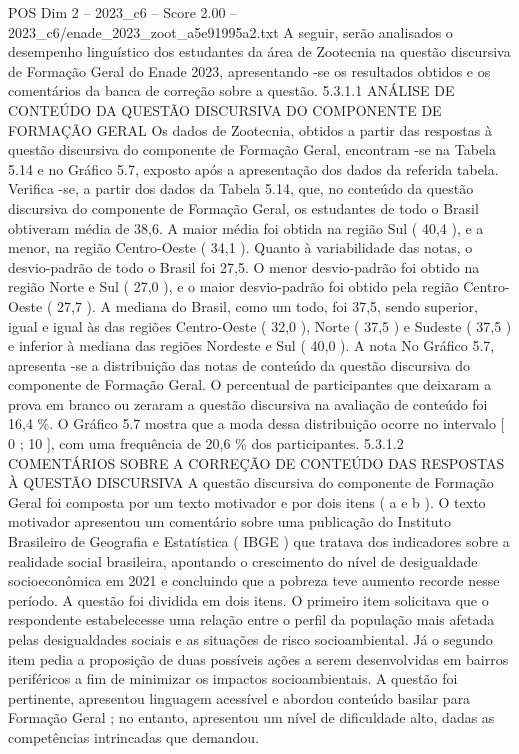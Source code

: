 \begin{textsample}{POS Dim 2 – 2023\_c6 – Score 2.00 – 2023\_c6/enade\_2023\_zoot\_a5e91995a2.txt}
A seguir, serão analisados o desempenho linguístico dos estudantes da área de Zootecnia na questão discursiva de Formação Geral do Enade 2023, apresentando -se os resultados obtidos e os comentários da banca de correção sobre a questão. 5.3.1.1 ANÁLISE DE CONTEÚDO DA QUESTÃO DISCURSIVA DO COMPONENTE DE FORMAÇÃO GERAL Os dados de Zootecnia, obtidos a partir das respostas à questão discursiva do componente de Formação Geral, encontram -se na Tabela 5.14 e no Gráfico 5.7, exposto após a apresentação dos dados da referida tabela.
Verifica -se, a partir dos dados da Tabela 5.14, que, no conteúdo da questão discursiva do componente de Formação Geral, os estudantes de todo o Brasil obtiveram média de 38,6.
A maior média foi obtida na região Sul ( 40,4 ), e a menor, na região Centro-Oeste ( 34,1 ).
Quanto à variabilidade das notas, o desvio-padrão de todo o Brasil foi 27,5.
O menor desvio-padrão foi obtido na região Norte e Sul ( 27,0 ), e o maior desvio-padrão foi obtido pela região Centro-Oeste ( 27,7 ).
A mediana do Brasil, como um todo, foi 37,5, sendo superior, igual e igual às das regiões Centro-Oeste ( 32,0 ), Norte ( 37,5 ) e Sudeste ( 37,5 ) e inferior à mediana das regiões Nordeste e Sul ( 40,0 ).
A nota No Gráfico 5.7, apresenta -se a distribuição das notas de conteúdo da questão discursiva do componente de Formação Geral.
O percentual de participantes que deixaram a prova em branco ou zeraram a questão discursiva na avaliação de conteúdo foi 16,4 \%.
O Gráfico 5.7 mostra que a moda dessa distribuição ocorre no intervalo [ 0 ; 10 ], com uma frequência de 20,6 \% dos participantes. 5.3.1.2 COMENTÁRIOS SOBRE A CORREÇÃO DE CONTEÚDO DAS RESPOSTAS À QUESTÃO DISCURSIVA A questão discursiva do componente de Formação Geral foi composta por um texto motivador e por dois itens ( a e b ).
O texto motivador apresentou um comentário sobre uma publicação do Instituto Brasileiro de Geografia e Estatística ( IBGE ) que tratava dos indicadores sobre a realidade social brasileira, apontando o crescimento do nível de desigualdade socioeconômica em 2021 e concluindo que a pobreza teve aumento recorde nesse período.
A questão foi dividida em dois itens.
O primeiro item solicitava que o respondente estabelecesse uma relação entre o perfil da população mais afetada pelas desigualdades sociais e as situações de risco socioambiental.
Já o segundo item pedia a proposição de duas possíveis ações a serem desenvolvidas em bairros periféricos a fim de minimizar os impactos socioambientais.
A questão foi pertinente, apresentou linguagem acessível e abordou conteúdo basilar para Formação Geral ; no entanto, apresentou um nível de dificuldade alto, dadas as competências intrincadas que demandou.

\end{textsample}
